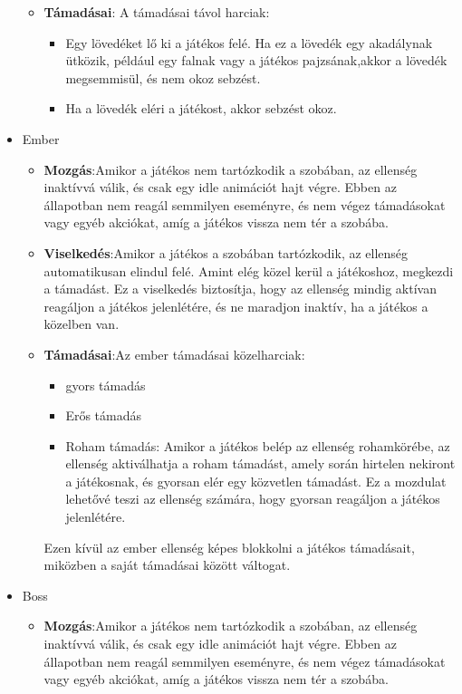 \documentclass[
]{thesis-ekf}
\theoremstyle{definition}
\theoremstyle{remark}
\begin{document}
\begin{itemize}
\begin{itemize}
\begin{itemize}
		\end{itemize}
		\item \textbf{Támadásai}: A támadásai távol harciak:
		\begin{itemize}
			\item Egy lövedéket lő ki a játékos felé. Ha ez a lövedék egy akadálynak ütközik, például egy falnak vagy a játékos pajzsának,akkor a lövedék megsemmisül, és nem okoz sebzést.
			\item Ha a lövedék eléri a játékost, akkor sebzést okoz.
		\end{itemize}
		
	\end{itemize}
	\item Ember
	\begin{itemize}
		\item \textbf{Mozgás}:Amikor a játékos nem tartózkodik a szobában, az ellenség inaktívvá válik, és csak egy idle animációt hajt végre. Ebben az állapotban nem reagál semmilyen eseményre, és nem végez támadásokat vagy egyéb akciókat, amíg a játékos vissza nem tér a szobába.
		\item \textbf{Viselkedés}:Amikor a játékos a szobában tartózkodik, az ellenség automatikusan elindul felé. Amint elég közel kerül a játékoshoz, megkezdi a támadást. Ez a viselkedés biztosítja, hogy az ellenség mindig aktívan reagáljon a játékos jelenlétére, és ne maradjon inaktív, ha a játékos a közelben van.
		\item \textbf{Támadásai}:Az ember támadásai közelharciak:
		\begin{itemize}
			\item gyors támadás
			\item Erős támadás
			\item Roham támadás: Amikor a játékos belép az ellenség rohamkörébe, az ellenség aktiválhatja a roham támadást, amely során hirtelen nekiront a játékosnak, és gyorsan elér egy közvetlen támadást. Ez a mozdulat lehetővé teszi az ellenség számára, hogy gyorsan reagáljon a játékos jelenlétére.
		\end{itemize}
		Ezen kívül az ember ellenség képes blokkolni a játékos támadásait, miközben a saját támadásai között váltogat.
	\end{itemize}
	\item Boss
	\begin{itemize}
		\item \textbf{Mozgás}:Amikor a játékos nem tartózkodik a szobában, az ellenség inaktívvá válik, és csak egy idle animációt hajt végre. Ebben az állapotban nem reagál semmilyen eseményre, és nem végez támadásokat vagy egyéb akciókat, amíg a játékos vissza nem tér a szobába.

\end{itemize}
\end{itemize}
\end{document}
